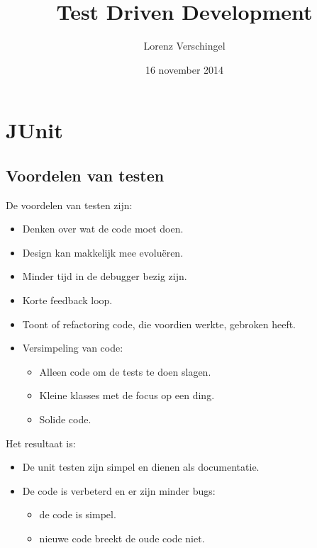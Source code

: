 \documentclass[11pt,a4paper]{article}
\begin{document}
\title{\Huge Test Driven Development}
\author{\LARGE Lorenz Verschingel}
\date{16 november 2014}
\maketitle
\clearpage

\tableofcontents
\clearpage

\section{JUnit}
\subsection[Voordelen]{Voordelen van testen}
De voordelen van testen zijn:
	\begin{itemize}
		\item Denken over wat de code moet doen.
		\item Design kan makkelijk mee evoluëren.
		\item Minder tijd in de debugger bezig zijn.
		\item Korte feedback loop.
		\item Toont of refactoring code, die voordien 				  werkte, gebroken heeft.
		\item Versimpeling van code:
		\begin{itemize}
			\item Alleen code om de tests te doen slagen.
			\item Kleine klasses met de focus op een ding.
			\item Solide code.
		\end{itemize}
	\end{itemize}
Het resultaat is:
\begin{itemize}
	\item De unit testen zijn simpel en dienen als documentatie.
	\item De code is verbeterd en er zijn minder bugs:
	\begin{itemize}
		\item de code is simpel.
		\item nieuwe code breekt de oude code niet.
	\end{itemize}
\end{itemize}
\end{document}

